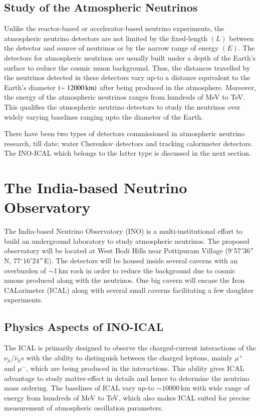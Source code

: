 \subsection{Study of the Atmospheric Neutrinos}
Unlike the reactor-based or accelerator-based neutrino experiments,
the atmospheric neutrino detectors are not limited by the fixed-length
$\left(L\right)$ between the detector and source of neutrinos or by
the narrow range of energy $\left(E\right)$. The detectors for
atmospheric neutrinos are usually built under a depth of the Earth's
surface to reduce the cosmic muon background. Thus, the distances
travelled by the neutrinos detected in these detectors vary up-to a
distance equivalent to the Earth's diameter
$\left(\sim 12000\text{\,km}\right)$ after being produced in the
atmosphere. Moreover, the energy of the atmospheric neutrinos ranges
from hundreds of MeV to TeV. This qualifies the atmospheric neutrino
detectors to study the neutrinos over widely varying baselines ranging
upto the diameter of the Earth.

There have been two types of detectors commissioned in atmospheric
neutrino research, till date; water Cherenkov detectors and tracking
calorimeter detectors. The INO-ICAL which belongs to the latter type
is discussed in the next section.

\section{The India-based Neutrino Observatory}
The India-based Neutrino Observatory (INO)\cite{inowhite,inoreport}
is a multi-institutional effort to build an underground laboratory to
study atmospheric neutrinos. The proposed observatory will be located
at West Bodi Hills near Pottipuram Village (9$^\circ$57$'$36$''$\,N,
77$^\circ$16$'$24$''$\,E). The detectors will be housed inside several
caverns with an overburden of $\sim$1\,km rock in order to reduce the
background due to cosmic muons produced along with the neutrinos. One
big cavern will encase the Iron CALorimeter (ICAL) along with several
small caverns facilitating a few daughter experiments.

\subsection{Physics Aspects of INO-ICAL}
The ICAL is primarily designed to observe the charged-current
interactions of the $\nu_{\mu}/\bar{\nu}_{\mu}$s with the ability to
distinguish between the charged leptons, mainly $\mu^{+}$ and $\mu^{-}$,
which are being produced in the interactions. This ability gives ICAL
advantage to study matter-effect in details and hence to determine the
neutrino mass ordering. The baselines of ICAL vary up-to
$\sim 10000$\,km with wide range of energy from hundreds of MeV to
TeV, which also makes ICAL suited for precise measurement of
atmospheric oscillation parameters.

